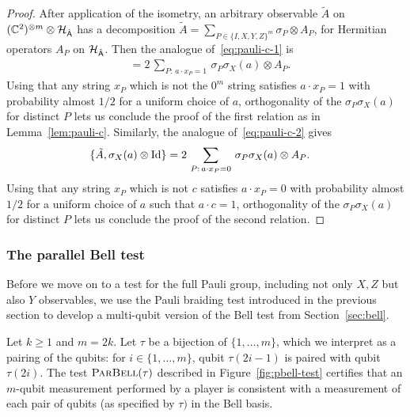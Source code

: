\begin{proof}
After application of the isometry, an arbitrary observable $\tilde{A}$ on  $(\mathbb{C}^2)^{\otimes m} \otimes \mathcal{H}_{\hat{{\textsf{A}}}}$ has a decomposition $\tilde{A} = \sum_{P\in\{I,X,Y,Z\}^m} \sigma_P \otimes A_P$, for Hermitian operators $A_P$ on $\mathcal{H}_{\hat{{\textsf{A}}}}$. 
 Then the analogue of~\eqref{eq:pauli-c-1} is
\begin{align*}
[\tilde{A},\sigma_X(a)\otimes \Id] &= 2 \,\sum_{P:\,a\cdot x_P=1} \,\sigma_P\sigma_X(a) \otimes A_P.
\end{align*} 
Using that any string $x_P$ which is not the $0^m$ string satisfies $a\cdot x_P = 1$ with probability almost $1/2$ for a uniform choice of $a$, orthogonality of the $\sigma_P\sigma_X(a) $ for distinct $P$ lets us conclude the proof of the first relation as in Lemma~\ref{lem:pauli-c}. Similarly, the analogue of~\eqref{eq:pauli-c-2} gives
\begin{align*}
\{\tilde{A},\sigma_X(a)\otimes \mathop{\rm Id}\nolimits\} &= 2 \,\sum_{P:\,a\cdot x_P=0} \,\sigma_P\sigma_X(a) \otimes A_P.
\end{align*} 
Using that any string $x_P$ which is not $c$ satisfies $a\cdot x_P = 0$ with probability almost $1/2$ for a uniform choice of $a$ such that $a\cdot c=1$, orthogonality of the $\sigma_P\sigma_X(a) $ for distinct $P$ lets us conclude the proof of the second relation.
\end{proof}


\subsubsection{The parallel Bell test}
\label{sec:perm}

Before we move on to a test for the full Pauli group, including not only $X,Z$ but also $Y$ observables, we use the Pauli braiding test introduced in the previous section to develop a multi-qubit version of the Bell test from Section~\ref{sec:bell}.

Let $k\geq 1$ and $m=2k$. Let $\tau$ be a bijection of $\{1,\ldots,m\}$, which we interpret as a pairing of the qubits: for $i\in\{1,\ldots,m\}$, qubit $\tau(2i-1)$ is paired with qubit $\tau(2i)$. 
The test $\textsc{ParBell}(\tau)$ described in Figure~\ref{fig:pbell-test} certifies that an $m$-qubit measurement performed by a player is consistent with a measurement of each pair of qubits (as specified by $\tau)$ in the Bell basis. 


